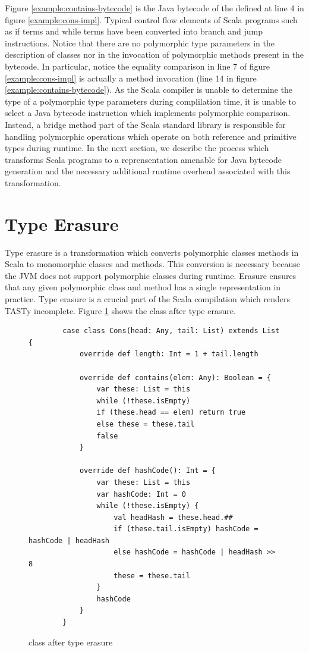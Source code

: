 Figure \ref{example:contains-bytecode} is the Java bytecode of the  defined at line 4 in figure \ref{example:cons-impl}.
Typical control flow elements of Scala programs such as if terms and while terms have been converted into branch and jump instructions.
Notice that there are no polymorphic type parameters in the description of classes nor in the invocation of polymorphic methods present in the bytecode.
In particular, notice the equality comparison in line 7 of figure \ref{example:cons-impl} is actually a method invocation (line 14 in figure \ref{example:contains-bytecode}).
As the Scala compiler is unable to determine the type of a polymorphic type parameters during complilation time, it is unable to select a Java bytecode instruction which implements polymorphic comparison.
Instead, a bridge method part of the Scala standard library is responsible for handling polymorphic operations which operate on both reference and primitive types during runtime.
In the next section, we describe the process which transforms Scala programs to a reprensentation amenable for Java bytecode generation and the necessary additional runtime overhead associated with this transformation.

\section{Type Erasure}
\label{background:type-erasure}

Type erasure\cite{java:generics} is a transformation which converts polymorphic classes methods in Scala to monomorphic classes and methods. 
This conversion is necessary because the JVM does not support polymorphic classes during runtime.
Erasure ensures that any given polymorphic class and method has a single representation in practice.
Type erasure is a crucial part of the Scala compilation which renders TASTy incomplete.
Figure \ref{example:erase-cons} shows the  class after type erasure.

\begin{figure}[!htb]
	\begin{verbatim}
		case class Cons(head: Any, tail: List) extends List {
			override def length: Int = 1 + tail.length
			
			override def contains(elem: Any): Boolean = {
				var these: List = this
				while (!these.isEmpty) 
				if (these.head == elem) return true
				else these = these.tail
				false
			}
			
			override def hashCode(): Int = {
				var these: List = this
				var hashCode: Int = 0
				while (!these.isEmpty) {
					val headHash = these.head.##
					if (these.tail.isEmpty) hashCode = hashCode | headHash
					else hashCode = hashCode | headHash >> 8
					these = these.tail	
				}
				hashCode
			}
		}		
	\end{verbatim}
	\caption{ class after type erasure}
	\label{example:erase-cons}
\end{figure}

